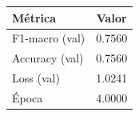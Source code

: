 \begin{tabular}{lc}
\toprule
Métrica & Valor \\
\midrule
F1-macro (val) & 0.7560 \\
Accuracy (val) & 0.7560 \\
Loss (val) & 1.0241 \\
Época & 4.0000 \\
\bottomrule
\end{tabular}
